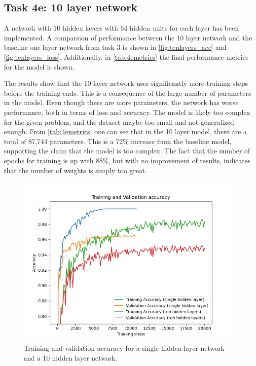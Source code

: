 \documentclass{article}
\begin{document}
\subsection{Task 4e: 10 layer network}
A network with 10 hidden layers with 64 hidden units for each layer has been implemented. A comparsion of performance between the 10 layer network and the baseline one layer network from task 3 is shown in \autoref{fig:tenlayers_acc} and \autoref{fig:tenlayers_loss}. Additionally, in \autoref{tab:4emetrics} the final performance metrics for the model is shown.  

The results show that the 10 layer network uses significantly more training steps before the training ends. This is a consequence of the large number of parameters in the model. Even though there are more parameters, the network has worse performance, both in terms of loss and accuracy. The model is likely too complex for the given problem, and the dataset maybe too small and not generalized enough. From \autoref{tab:4emetrics} one can see that in the 10 layer model, there are a total of 87,744 parameters. This is a 72\% increase from the baseline model, supporting the claim that the model is too complex. The fact that the number of epochs for training is up with 88\%, but with no improvement of results, indicates that the number of weights is simply too great. 


\begin{figure}[H]
    \centering
    \includegraphics[width=\textwidth]{Assignments/Assignment_2/plots/task4/task4e_acc.png}
    \caption{Training and validation accuracy for a single hidden layer network and a 10 hidden layer network.}
    \label{fig:tenlayers_acc}
\end{figure}
\end{document}
